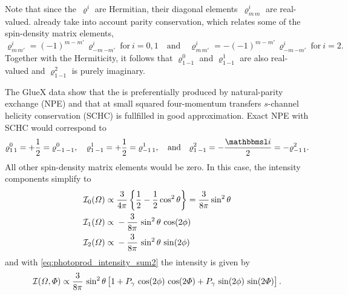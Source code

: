Note that since the~$\varrho^i$ are Hermitian, their diagonal
elements~$\varrho^i_{m\, m}$ are real-valued.
already take into account parity conservation, which relates some of
the spin-density matrix elements, \ie
\begin{equation}
  \label{eq:parity_rho_photoprod}
  \varrho^i_{m\, m'} = (-1)^{m - m'}\, \varrho^i_{{-m}\, {-m'}}
  ~\text{for}~ i = 0, 1
  \quad\text{and}\quad
  \varrho^i_{m\, m'} = -(-1)^{m - m'}\, \varrho^i_{{-m}\, {-m'}}
  ~\text{for}~ i = 2.
\end{equation}
Together with the Hermiticity, it follows that $\varrho^0_{1\, {-1}}$ and
$\varrho^1_{1\, {-1}}$ are also real-valued and $\varrho^2_{1\, {-1}}$ is
purely imaginary.

The GlueX data show that the \Prho is preferentially produced by
natural-parity exchange (NPE) and that at small squared four-momentum
transfers $s$-channel helicity conservation (SCHC) is fullfilled in
good approximation.  Exact NPE with SCHC would correspond to
\begin{equation}
  \label{eq:spin_dens_npe_schc_rho_photoprod}
  \varrho^0_{1\, 1}
  = +\frac{1}{2}
  = \varrho^0_{{-1}\, {-1}},
  \quad
  \varrho^1_{1\, {-1}}
  = +\frac{1}{2}
  = \varrho^1_{{-1}\, 1},
  \quad\text{and}\quad
  \varrho^2_{1\, {-1}}
  = -\frac{\imag}{2}
  = -\varrho^2_{{-1}\, 1}.
\end{equation}
All other spin-density matrix elements would be zero.  In this case,
the intensity components simplify to
\begin{align}
  \label{eq:intensity_0_npe_schc_rho_photoprod}
  \intensity_0(\Omega)
  \propto{}& \frac{3}{4 \pi} \cBrk{\frac{1}{2}- \frac{1}{2} \cos^2 \theta}
  = \frac{3}{8 \pi} \sin^2 \theta \\
  \label{eq:intensity_1_npe_schc_rho_photoprod}
  \intensity_1(\Omega)
  \propto{}& -\frac{3}{8 \pi}\, \sin^2 \theta\, \cos(2 \phi) \\
  \label{eq:intensity_2_npe_schc_rho_photoprod}
  \intensity_2(\Omega)
  \propto{}& -\frac{3}{8 \pi}\, \sin^2 \theta\, \sin(2 \phi)
\end{align}
and with \cref{eq:photoprod_intensity_sum2} the intensity is given by
\begin{equation}
  \label{eq:intensity_npe_schc_rho_photoprod}
  \intensity(\Omega, \Phi)
  \propto \frac{3}{8 \pi}\, \sin^2 \theta \sBrk{1
  + P_\gamma\, \cos(2 \phi)\, \cos(2 \Phi)
  + P_\gamma\, \sin(2 \phi)\, \sin(2 \Phi)}.
\end{equation}

